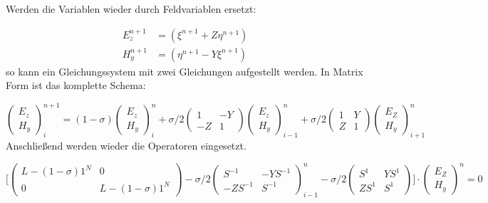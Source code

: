 Werden die Variablen wieder durch Feldvariablen ersetzt:
\par
\begin{align*}
	E^{n+1}_z &= (\xi^{n+1} + Z\eta^{n+1}) \\
	H^{n+1}_y &= (\eta^{n+1} - Y\xi^{n+1})
\end{align*}
so kann ein Gleichungssystem mit zwei Gleichungen aufgestellt werden. In Matrix Form ist das komplette Schema:
\par
\begin{equation*}
	\begin{pmatrix} 
		E_z \\
		H_y
	\end{pmatrix}^{n+1}_i
	=
	(1-\sigma)
	\begin{pmatrix}
		E_z \\
		H_y
	\end{pmatrix}^n_i
	+
	\sigma/2
	\begin{pmatrix}
		1 & -Y \\
		-Z & 1
	\end{pmatrix}
	\begin{pmatrix}
		E_z \\
		H_y
	\end{pmatrix}^n_{i-1}
	+
	\sigma/2
	\begin{pmatrix}
		1 & Y \\
		Z & 1
	\end{pmatrix}
	\begin{pmatrix}
		E_Z \\
		H_y
	\end{pmatrix}^n_{i+1}
\end{equation*}
Anschlie\ss{}end werden wieder die Operatoren eingesetzt.
\par
\begin{equation*}
	\bigg[
	\begin{pmatrix}
		L - (1-\sigma)1^N & 0 \\
		0 & L - (1-\sigma)1^N
	\end{pmatrix}
	-
	\sigma/2
	\begin{pmatrix}
		S^{-1} & -YS^{-1} \\
		-ZS^{-1} & S^{-1}
	\end{pmatrix}^n_{i-1}
	-
	\sigma/2
	\begin{pmatrix}
		S^{1} & YS^{1} \\
		ZS^{1} & S^{1}
	\end{pmatrix}
	\bigg]
	\cdot
	\begin{pmatrix}
		E_Z \\
		H_y
	\end{pmatrix}^n
	=
	0
\end{equation*}
